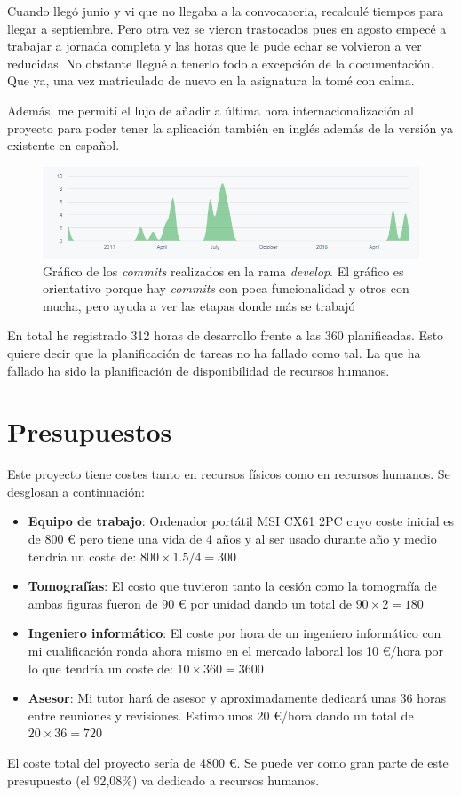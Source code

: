 Cuando llegó junio y vi que no llegaba a la convocatoria, recalculé tiempos para llegar a septiembre. Pero otra vez se vieron trastocados pues en agosto empecé a trabajar a jornada completa y las horas que le pude echar se volvieron a ver reducidas. No obstante llegué a tenerlo todo a excepción de la documentación. Que ya, una vez matriculado de nuevo en la asignatura la tomé con calma.

Además, me permití el lujo de añadir a última hora internacionalización al proyecto para poder tener la aplicación también en inglés además de la versión ya existente en español.

\begin{figure}[H]
	\centering
	\includegraphics[width=12cm]{imagenes/planificacion/resultados}
	\caption{Gráfico de los \textit{commits} realizados en la rama \textit{develop}. El gráfico es orientativo porque hay \textit{commits} con poca funcionalidad y otros con mucha, pero ayuda a ver las etapas donde más se trabajó}
	\label{fig:planificacion/resultados}
\end{figure}

En total he registrado 312 horas de desarrollo frente a las 360 planificadas. Esto quiere decir que la planificación de tareas no ha fallado como tal. La que ha fallado ha sido la planificación de disponibilidad de recursos humanos.

\section{Presupuestos}

Este proyecto tiene costes tanto en recursos físicos como en recursos humanos. Se desglosan a continuación:

\begin{itemize}
	\item \textbf{Equipo de trabajo}: Ordenador portátil MSI CX61 2PC cuyo coste inicial es de 800 \euro{} pero tiene una vida de 4 años y al ser usado durante año y medio tendría un coste de: $ 800 \times 1.5 / 4 = 300 $
	\item \textbf{Tomografías}: El costo que tuvieron tanto la cesión como la tomografía de ambas figuras fueron de 90 \euro{} por unidad dando un total de $ 90 \times 2 = 180 $
	\item \textbf{Ingeniero informático}: El coste por hora de un ingeniero informático con mi cualificación ronda ahora mismo en el mercado laboral los 10 \euro{}/hora por lo que tendría un coste de: $ 10 \times 360 = 3600 $
	\item \textbf{Asesor}: Mi tutor hará de asesor y aproximadamente dedicará unas 36 horas entre reuniones y revisiones. Estimo unos 20 \euro{}/hora dando un total de $ 20 \times 36 = 720$
\end{itemize}

El coste total del proyecto sería de 4800 \euro{}. Se puede ver como gran parte de este presupuesto (el 92,08\%) va dedicado a recursos humanos.